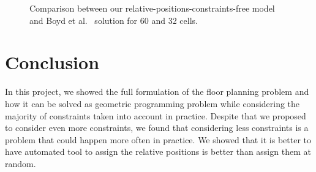 \documentclass[12pt] {article}
\begin{document}
\begin{figure}[!tbh]
\centering        
   \caption{Comparison between our relative-positions-constraints-free model and Boyd et al.~\citep{boyd2004convex} solution for 60 and 32 cells.}
   \label{fig:comp}
\end{figure}



\section{Conclusion}
In this project, we showed the full formulation of the floor planning problem and how it can be solved as geometric programming problem while considering the majority of constraints taken into account in practice. Despite that we proposed to consider even more constraints, we found that considering less constraints is a problem that could happen more often in practice. We showed that it is better to have automated tool to assign the relative positions is better than assign them at random. 


\end{document}
